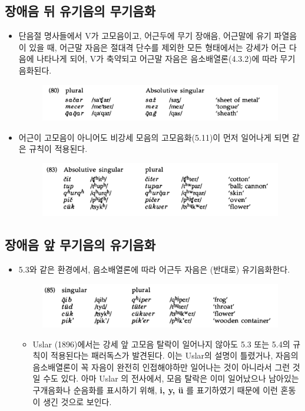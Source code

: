 \subsection{장애음 뒤 유기음의 무기음화}
\begin{itemize}
\item 단음절 명사들에서 V가 고모음이고, 어근두에 무기 장애음, 어근말에 유기 파열음이 있을 때, 어근말 자음은 절대격 단수를 제외한 모든 형태에서는 강세가 어근 다음에 나타나게 되어, V가 축약되고 어근말 자음은 음소배열론(4.3.2)에 따라 무기음화된다. 
\begin{figure}[H]
\centerline{\includegraphics[width=.8\linewidth]{Lezgian/src/ex80.png}}
\end{figure}
\item 어근이 고모음이 아니어도 비강세 모음의 고모음화(5.11)이 먼저 일어나게 되면 같은 규칙이 적용된다.
\begin{figure}[H]
\centerline{\includegraphics[width=.8\linewidth]{Lezgian/src/ex83.png}}
\end{figure}
\end{itemize}

\subsection{장애음 앞 무기음의 유기음화}
\begin{itemize}
\item 5.3와 같은 환경에서, 음소배열론에 따라 어근두 자음은 (반대로) 유기음화한다.
\begin{figure}[H]
\centerline{\includegraphics[width=.8\linewidth]{Lezgian/src/ex85.png}}
\end{figure}
\begin{itemize}
\item Uslar (1896)에서는 강세 앞 고모음 탈락이 일어나지 않아도 5.3 또는 5.4의 규칙이 적용된다는 패러독스가 발견된다. 이는 Uslar의 설명이 틀렸거나, 자음의 음소배열론이 꼭 자음이 완전히 인접해야하만 일어나는 것이 아니라서 그런 것일 수도 있다. 아마 Uslar 의 전사에서, 모음 탈락은 이미 일어났으나 남아있는 구개음화나 순음화를 표시하기 위해, \textbf{i, y, ü} 를 표기하였기 때문에 이런 혼동이 생긴 것으로 보인다.
\end{itemize}
\end{itemize}

